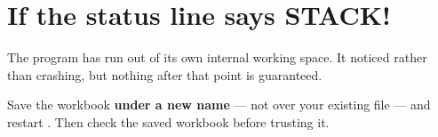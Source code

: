 \section{If the status line says STACK!}

\begin{cccaution}
The program has run out of its own internal working space. It noticed rather
than crashing, but nothing after that point is guaranteed.

Save the workbook \textbf{under a new name} --- not over your existing file ---
and restart \ccprod{}. Then check the saved workbook before trusting it.
\end{cccaution}
